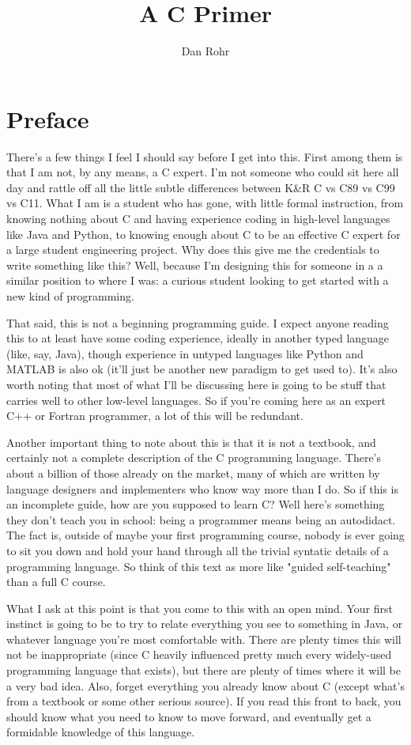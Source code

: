 \documentclass[ebook,11pt,oneside,openany]{memoir}
\title{A C Primer}
\author{Dan Rohr}
\begin{document}
\maketitle

\chapter*{Preface}

There's a few things I feel I should say before I get into this. First among them is that I am not, by any means, a C expert. I'm not someone who could sit here all day and rattle off all the little subtle differences between K\&R C vs C89 vs C99 vs C11. What I am is a student who has gone, with little formal instruction, from knowing nothing about C and having experience coding in high-level languages like Java and Python, to knowing enough about C to be an effective C expert for a large student engineering project. Why does this give me the credentials to write something like this? Well, because I'm designing this for someone in a a similar position to where I was: a curious student looking to get started with a new kind of programming.

That said, this is not a beginning programming guide. I expect anyone reading this to at least have some coding experience, ideally in another typed language (like, say, Java), though experience in untyped languages like Python and MATLAB is also ok (it'll just be another new paradigm to get used to). It's also worth noting that most of what I'll be discussing here is going to be stuff that carries well to other low-level languages. So if you're coming here as an expert C++ or Fortran programmer, a lot of this will be redundant.

Another important thing to note about this is that it is not a textbook, and certainly not a complete description of the C programming language. There's about a billion of those already on the market, many of which are written by language designers and implementers who know way more than I do. So if this is an incomplete guide, how are you supposed to learn C? Well here's something they don't teach you in school: being a programmer means being an autodidact. The fact is, outside of maybe your first programming course,  nobody is ever going to sit you down and hold your hand through all the trivial syntatic details of a programming language. So think of this text as more like "guided self-teaching" than a full C course.

What I ask at this point is that you come to this with an open mind. Your first instinct is going to be to try to relate everything you see to something in Java, or whatever language you're most comfortable with. There are plenty times this will not be inappropriate (since C heavily influenced pretty much every widely-used programming language that exists), but there are plenty of times where it will be a very bad idea. Also, forget everything you already know about C (except what's from a textbook or some other serious source). If you read this front to back, you should know what you need to know to move forward, and eventually get a formidable knowledge of this language.
\end{document}
